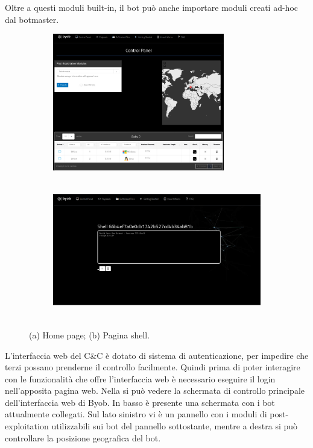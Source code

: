 Oltre a questi moduli built-in, il bot può anche importare moduli creati ad-hoc dal botmaster.




\begin{figure}[hbtp]
    \centering
    \begin{subfigure}[hbtp]{0.45\textwidth}
        \centering
        \includegraphics[width=\textwidth, height=6cm]{res/fig/byob-home.png}
        \caption{}
        \label{fig:byobhome}
    \end{subfigure}
    \hfill
    \begin{subfigure}[hbtp]{0.45\textwidth}
        \centering
        \includegraphics[width=\textwidth , height=6cm]{res/fig/byob-shell.png}
        \caption{}
        \label{fig:byobshell}
    \end{subfigure}
    \caption{(a) Home page; (b) Pagina shell.}
    \label{ciao1}
\end{figure}

L'interfaccia web del C\&C è  dotato di sistema di autenticazione, per impedire che terzi possano prenderne il controllo facilmente. Quindi prima di poter interagire con le funzionalità che offre l'interfaccia web è necessario eseguire il login nell'apposita pagina web.
Nella   si può vedere la schermata di controllo principale dell'interfaccia web di Byob. In basso è presente una schermata con i bot attualmente collegati. Sul lato  sinistro vi è  un pannello con i moduli di post-exploitation utilizzabili sui bot del pannello sottostante, mentre a destra si può controllare la posizione geografica del bot. 

